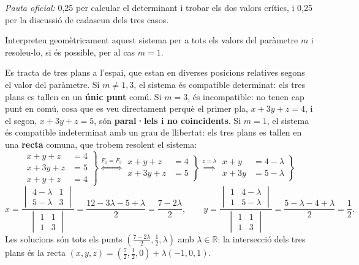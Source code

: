 \begin{apartats}
\begin{solucio}
\textit{Pauta oficial:} 0,25 per calcular el determinant i trobar els dos valors crítics, i
0,25 per la discussió de cadascun dels tres casos.
\end{solucio}

Interpreteu geomètricament aquest sistema per a tots els valors del paràmetre $m$ i
resoleu-lo, si és possible, per al cas $m=1$.

\begin{solucio}
Es tracta de tres plans a l'espai, que estan en diverses posicions relatives segons el valor
del paràmetre. Si $m\neq1,3$, el sistema és compatible determinat: els tres plans es tallen
en un \textbf{únic punt} comú. Si $m=3$, és incompatible: no tenen cap punt en comú, cosa que
es veu directament perquè el primer pla, $x+3y+z=4$, i el segon, $x+3y+z=5$, són
\textbf{paral·lels i no coincidents}. Si $m=1$, el sistema és compatible indeterminat amb un
grau de llibertat: els tres plans es tallen en una \textbf{recta} comuna, que trobem resolent
el sistema:
\[
\left.\begin{aligned}x+y+z&=4\\x+3y+z&=5\\x+y+z&=4\end{aligned}\right\}
\overset{F_1=F_3}{\iff}
\left.\begin{aligned}x+y+z&=4\\x+3y+z&=5\end{aligned}\right\}
\overset{z=\lambda}{\implies}
\left.\begin{aligned}x+y&=4-\lambda\\x+3y&=5-\lambda\end{aligned}\right\}
\]
\[
x=\frac{\begin{vmatrix}4-\lambda&1\\5-\lambda&3\end{vmatrix}}{\begin{vmatrix}1&1\\1&3\end{vmatrix}}
 =\frac{12-3\lambda-5+\lambda}{2}=\frac{7-2\lambda}{2},\qquad
y=\frac{\begin{vmatrix}1&4-\lambda\\1&5-\lambda\end{vmatrix}}{\begin{vmatrix}1&1\\1&3\end{vmatrix}}
 =\frac{5-\lambda-4+\lambda}{2}=\frac12.
\]
Les solucions són tots els punts $\left(\frac{7-2\lambda}{2},\frac12,\lambda\right)$ amb
$\lambda\in\mathbb{R}$: la intersecció dels tres plans és la recta
$(x,y,z)=\left(\frac72,\frac12,0\right)+\lambda(-1,0,1)$.


\end{solucio}
\end{apartats}
